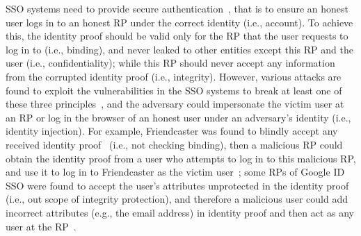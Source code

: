 SSO systems need to provide secure authentication~\cite{SPRESSO}, that is to ensure an honest user logs in to an honest RP under the correct identity (i.e., account).
To achieve this, the identity proof should be valid only for the RP that the user requests to log in to (i.e., binding),
  and never leaked to other entities except this RP and the user (i.e., confidentiality);
   while this RP should never accept any information from the corrupted identity proof (i.e., integrity).
However, various attacks are found to exploit the vulnerabilities in the SSO systems to break at least one of these three principles~\cite{ChenPCTKT14, FettKS16,WangCW12,ZhouE14,WangZLG16,YangLLZH16,SomorovskyMSKJ12,MohsenS16}, and the adversary could impersonate the victim user at an RP or log in the browser of an honest user under an adversary’s identity (i.e., identity injection).
For example, Friendcaster was found to blindly accept any received identity proof~\cite{ExplicatingSDK,ChenPCTKT14} (i.e., not checking binding), then a malicious RP could obtain the identity proof from a user who attempts to log in to this malicious RP, and use it to log in to Friendcaster as the victim user~\cite{MohsenS16};
some RPs of Google ID SSO were found to accept the user's attributes unprotected in the identity proof (i.e., out scope of  integrity protection), and therefore a malicious user could add incorrect attributes (e.g., the email address) in identity proof and then act as any user at the RP~\cite{WangCW12}.


